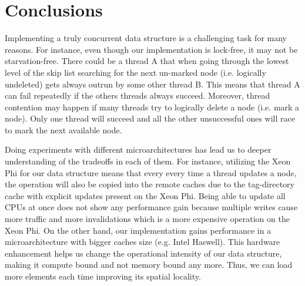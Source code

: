 \section{Conclusions}
\label{sec:con}
Implementing a truly concurrent data structure is a challenging task for many reasons. For instance, even though our implementation is lock-free, it may not be starvation-free. There could be a thread A that when going through the lowest level of the skip list searching for the next un-marked node (i.e. logically undeleted) gets always outrun by some other thread B. This means that thread A can fail repeatedly if the others threads always succeed. Moreover, thread contention may happen if many threads try to logically delete a node (i.e. mark a node). Only one thread will succeed and all the other unsuccessful ones will race to mark 
the next available node. 

Doing experiments with different microarchitectures has lead us to deeper understanding of the tradeoffs in each of them. For instance, utilizing the Xeon Phi for our data structure means that every every time a thread updates a node, the operation will also be copied into the remote caches due to the tag-directory cache with explicit updates present on the Xeon Phi. Being able to update all CPUs at once does not show any performance gain because multiple writes cause more traffic and more invalidations which is a more expensive operation on the Xeon Phi. On the other hand, our implementation gains performance in a microarchitecture with bigger caches size (e.g. Intel Haswell). This hardware enhancement helps us change the operational intensity of our data structure, making it compute bound and not memory bound any more. Thus, we can load more elements each time improving its spatial locality.